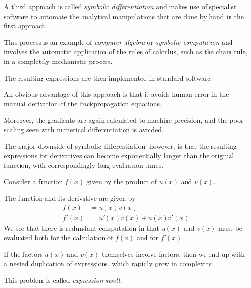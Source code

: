 \documentclass{article}
\begin{document}
A third approach is called \textit{symbolic differentiation} and makes use of specialist software to automate the analytical manipulations that are done by hand in the first approach. 

This process is an example of \textit{computer algebra} or \textit{symbolic computation} and involves the automatic application of the rules of calculus, such as the chain rule, in a completely mechanistic process. 

The resulting expressions are then implemented in standard software. 

An obvious advantage of this approach is that it avoids human error in the manual derivation of the backpropagation equations. 

Moreover, the gradients are again calculated to machine precision, and the poor scaling seen with numerical differentiation is avoided. 

The major downside of symbolic differentiation, however, is that the resulting expressions for derivatives can become exponentially longer than the original function, with correspondingly long evaluation times. 

Consider a function $f(x)$ given by the product of $u(x)$ and $v(x)$. 

The function and its derivative are given by
\begin{align}
f(x) &= u(x)v(x) \tag{8.42} \\
f'(x) &= u'(x)v(x) + u(x)v'(x). 
\tag{8.43}
\end{align}
We see that there is redundant computation in that $u(x)$ and $v(x)$ must be evaluated both for the calculation of $f(x)$ and for $f'(x)$. 

If the factors $u(x)$ and $v(x)$ themselves involve factors, then we end up with a nested duplication of expressions, which rapidly grow in complexity. 

This problem is called \textit{expression swell}.
\end{document}
